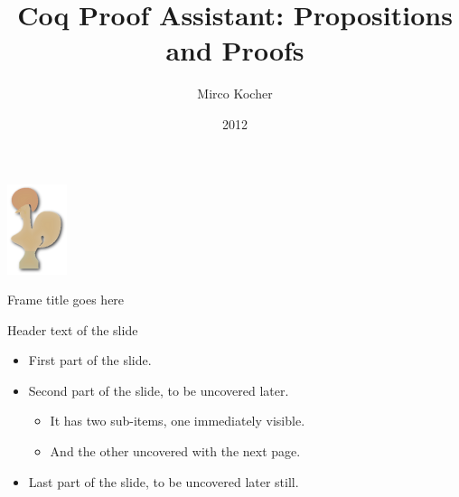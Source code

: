 

\title{Coq Proof Assistant: Propositions and Proofs}
\author{Mirco Kocher}
\date{2012}



{ \logo{} %
\begin{frame} %

	\begin{center}
		\includegraphics{coq_logo.png}
	\end{center}
	
	\titlepage
	
\end{frame}
}

\begin{frame}{Frame title goes here}

	Header text of the slide

	\begin{itemize}

	\item First part of the slide.

	\pause		
	
	\item Second part of the slide, to be uncovered later.
	
	\begin{itemize}
		\item It has two sub-items, one immediately visible.

		\pause	
	
		\item And the other uncovered with the next page.
	\end{itemize}		
	
	\pause	
	
	\item Last part of the slide, to be uncovered later still.	
	
	\end{itemize}
	
\end{frame}


